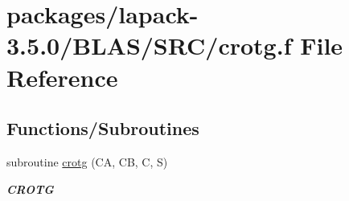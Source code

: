 \hypertarget{lapack-3_85_80_2BLAS_2SRC_2crotg_8f}{}\section{packages/lapack-\/3.5.0/\+B\+L\+A\+S/\+S\+R\+C/crotg.f File Reference}
\label{lapack-3_85_80_2BLAS_2SRC_2crotg_8f}
\subsection*{Functions/\+Subroutines}
\begin{DoxyCompactItemize}
\item 
subroutine \hyperlink{group__complex__blas__level1_ga27b909f1b845f8dc1d34d28941e4f9e3}{crotg} (C\+A, C\+B, C, S)
\begin{DoxyCompactList}\small\item\em {\bfseries C\+R\+O\+T\+G} \end{DoxyCompactList}\end{DoxyCompactItemize}
